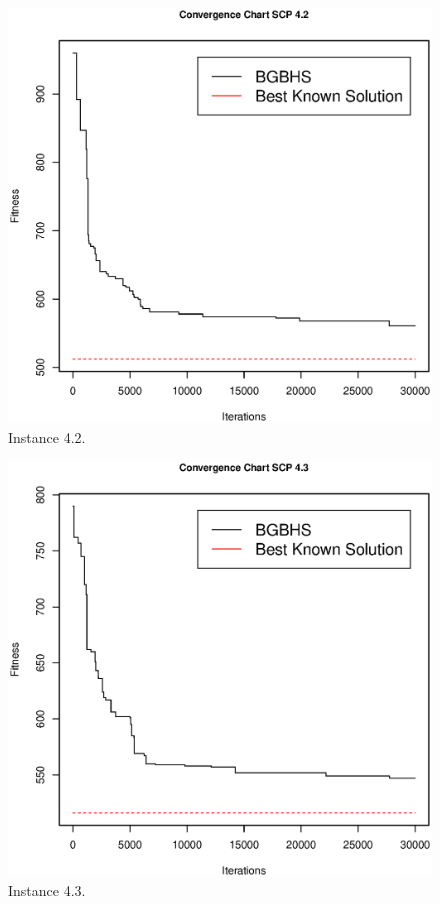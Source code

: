 \begin{figure}[]
\centering
\includegraphics[scale=.45]{Resultados/scp42.eps}
\caption{Instance 4.2.}
\label{fig:Instance.4.2}
\end{figure}

\clearpage

\begin{figure}[]
\centering
\includegraphics[scale=.5]{Resultados/scp43.eps}
\caption{Instance 4.3.}
\label{fig:Instance.4.3}
\end{figure}

